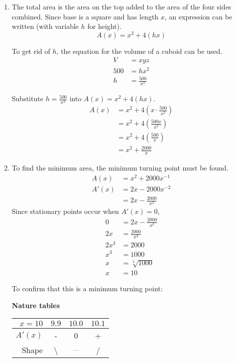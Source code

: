 \bigskip

\begin{enumerate}
	\item
	The total area is the area on the top added to the area of the four sides combined. Since base is a square and has length $x$, an expression can be written (with variable $h$ for height).
	\begin{equation*}
		A(x) = x^2 + 4(hx)
	\end{equation*}
	
	To get rid of $h$, the equation for the volume of a cuboid can be used.
	\begin{align*}
		V &= x y z\\
		500 &= h x^2\\
		h &= \frac{500}{x^2}
	\end{align*}
	
	Substitute $h = \frac{500}{x^2}$ into $A(x) = x^2 + 4(hx)$.
	\begin{align*}
		A(x) &= x^2 + 4\left(x \cdot \frac{500}{x^2}\right)\\
		&= x^2 + 4\left(\frac{500x}{x^2}\right)\\
		&= x^2 + 4\left(\frac{500}{x}\right)\\
		&= x^2 + \frac{2000}{x}
	\end{align*}
	
	\item 
	To find the minimum area, the minimum turning point must be found.
	\begin{align*}
		A(x) &= x^2+2000x^{-1}\\
		A'(x) &= 2x-2000x^{-2}\\
		&= 2x-\frac{2000}{x^2}
	\end{align*}
	Since stationary points occur when $A'(x)=0$,
	\begin{align*}
		0 &= 2x-\frac{2000}{x^2}\\
		2x &= \frac{2000}{x^2}\\
		2x^3 &= 2000\\
		x^3 &= 1000\\
		x &= \sqrt[3]{1000}\\
		x &= 10
	\end{align*}
	
	To confirm that this is a minimum turning point:
	
	\textbf{Nature tables}
	
	\medskip
	
	\begin{tabular}{r | c c c}
		$x=10$ & $9.9$ & $10.0$ & $10.1$\\
		\hline
		$A'(x)$ & - & 0 & +\\
		Shape & \textbackslash & $_{\text{---}}$ & / \\
	\end{tabular}


\end{enumerate}
